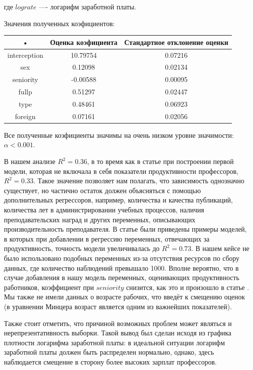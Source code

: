 \documentclass[a4paper, 12pt]{article}
\theoremstyle{definition}
\theoremstyle{plain}
\begin{document}
где $lograte$ —- логарифм заработной платы.

Значения полученных коэфициентов:

\begin{center}
\begin{tabular}{|c|c|c|}
\hline
• & Оценка коэфициента & Стандартное отклонение оценки \\
\hline
interception & 10.79754 & 0.07216 \\
\hline
sex & 0.12098 & 0.02134 \\
\hline
seniority & -0.00588 & 0.00095 \\
\hline
fullp & 0.51297 & 0.02447 \\
\hline
type & 0.48461 & 0.06923 \\
\hline
foreign & 0.07161 & 0.02056 \\
\hline
\end{tabular}
\end{center}

Все полученные коэфициенты значимы на очень низком уровне значимости: $\alpha<0.001$.

В нашем анализе $R^2=0.36$, в то время как в статье \cite{3} при построении первой модели, которая не включала в себя показатели продуктивности профессоров, $R^2=0.33$. Такое значение позволяет нам полагать, что зависимость однозначно существует, но частично остаток должен объясняться с помощью дополнительных регрессоров, например, количества и качества публикаций, количества лет в администрировании учебных процессов, наличия преподавательских наград и других переменных, описывающих производительность преподавателя. В статье \cite{3} были приведены примеры моделей, в которых при добавлении в регрессию переменных, отвечающих за продуктивность, точность модели увеличивалась до $R^2=0.73$. В нашем кейсе не было использовано подобных переменных из-за отсутствия ресурсов по сбору данных, где количество наблюдений превышало 1000. Вполне вероятно, что в случае добавления в нашу модель переменных, оценивающих продуктивность работников, коэффициент при $seniority$ снизится, как это и произошло в статье \cite{3}. Мы также не имели данных о возрасте рабочих, что введёт к смещению оценок (в уравнении Минцера возраст является одним из важнейших показателей).

Также стоит отметить, что причиной возможных проблем может являться и нерепрезентативность выборки. Такой вывод был сделан исходя из графика плотности логарифма заработной платы: в идеальной ситуации логарифм заработной платы должен быть распределен нормально, однако, здесь наблюдается смещение в сторону более высоких зарплат профессоров.
\end{document}
